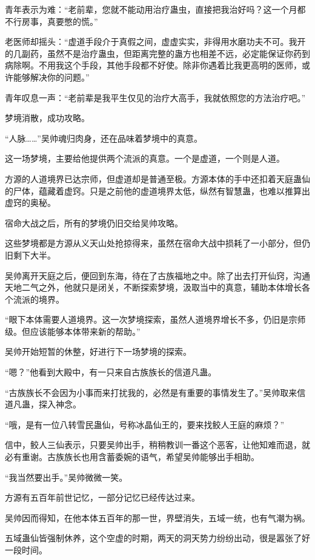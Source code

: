 \begin{this_body}
青年表示为难：“老前辈，您就不能动用治疗蛊虫，直接把我治好吗？这一个月都不行房事，真要憋的慌。”

老医师却摇头：“虚道手段介于真假之间，虚虚实实，非得用水磨功夫不可。我开的几副药，虽然不是治疗蛊虫，但距离完整的蛊方也相差不远，必定能保证你药到病除啊。不用我这个手段，其他手段都不好使。除非你遇着比我更高明的医师，或许能够解决你的问题。”

青年叹息一声：“老前辈是我平生仅见的治疗大高手，我就依照您的方法治疗吧。”

梦境消散，成功攻略。

“人脉……”吴帅魂归肉身，还在品味着梦境中的真意。

这一场梦境，主要给他提供两个流派的真意。一个是虚道，一个则是人道。

方源的人道境界已达宗师，但虚道却是普通至极。方源本体的手中还扣着天庭蛊仙的尸体，蕴藏着虚窍。只是之前他的虚道境界太低，纵然有智慧蛊，也难以推算出虚窍的奥秘。

宿命大战之后，所有的梦境仍旧交给吴帅攻略。

这些梦境都是方源从义天山处抢掠得来，虽然在宿命大战中损耗了一小部分，但仍旧剩下大半。

吴帅离开天庭之后，便回到东海，待在了古族福地之中。除了出去打开仙窍，沟通天地二气之外，他就只是闭关，不断探索梦境，汲取当中的真意，辅助本体增长各个流派的境界。

“眼下本体需要人道境界。这一次梦境探索，虽然人道境界增长不多，仍旧是宗师级。但应该能够本体带来新的帮助。”

吴帅开始短暂的休整，好进行下一场梦境的探索。

“嗯？”他看到大殿中，有一只来自古族族长的信道凡蛊。

“古族族长不会因为小事而来打扰我的，必然是有重要的事情发生了。”吴帅取来信道凡蛊，探入神念。

“哦，是有一位八转雪民蛊仙，号称冰晶仙王的，要来找鲛人王庭的麻烦？”

信中，鲛人三仙表示，只要吴帅出手，稍稍教训一番这个恶客，让他知难而退，就必有重谢。古族族长也用含蓄委婉的语气，希望吴帅能够出手相助。

“我当然要出手。”吴帅微微一笑。

方源有五百年前世记忆，一部分记忆已经传达过来。

吴帅因而得知，在他本体五百年的那一世，界壁消失，五域一统，也有气潮为祸。

五域蛊仙皆强制休养，这个空虚的时期，两天的洞天势力纷纷出动，很是嚣张了好一段时间。


\end{this_body}
